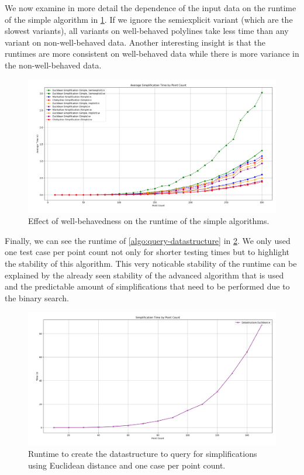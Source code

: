 We now examine in more detail the dependence of the input data on the runtime of the simple algorithm in \cref{fig:res_simple}. If we ignore the semiexplicit variant (which are the slowest variants), all variants on well-behaved polylines take less time than any variant on non-well-behaved data. Another interesting insight is that the runtimes are more consistent on well-behaved data while there is more variance in the non-well-behaved data. 

\begin{figure}[b]
  \centering
	\includegraphics[scale=0.4]{./figures/res_simple.png}
  \caption{Effect of well-behavedness on the runtime of the simple algorithms.}
  \label{fig:res_simple}
\end{figure}


Finally, we can see the runtime of \cref{algo:query-datastructure} in \cref{fig:res_ds}. We only used one test case per point count not only for shorter testing times but to highlight the stability of this algorithm. This very noticable stability of the runtime can be explained by the already seen stability of the advanced algorithm that is used and the predictable amount of simplifications that need to be performed due to the binary search.

\begin{figure}[b]
  \centering
	\includegraphics[scale=0.4]{./figures/res_ds.png}
  \caption{Runtime to create the datastructure to query for simplifications using Euclidean distance and one case per point count.}
  \label{fig:res_ds}
\end{figure}


